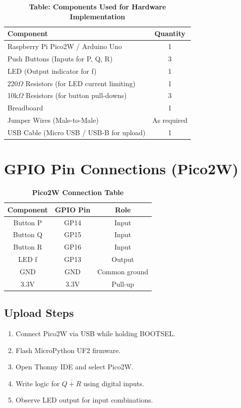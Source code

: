 \documentclass[twocolumn]{article}
\begin{document}
\begin{table}[h]
\centering
\renewcommand{\arraystretch}{1.2}
\begin{tabular}{|>{\raggedright}p{5cm}|c|}
\hline
\textbf{Component} & \textbf{Quantity} \\
\hline
Raspberry Pi Pico2W / Arduino Uno & 1 \\
Push Buttons (Inputs for P, Q, R) & 3 \\
LED (Output indicator for f) & 1 \\
220$\Omega$ Resistors (for LED current limiting) & 1 \\
10k$\Omega$ Resistors (for button pull-downs) & 3 \\
Breadboard & 1 \\
Jumper Wires (Male-to-Male) & As required \\
USB Cable (Micro USB / USB-B for upload) & 1 \\
\hline
\end{tabular}
\caption*{\textbf{Table: Components Used for Hardware Implementation}}
\end{table}

\vspace{7em}
\section*{GPIO Pin Connections (Pico2W)}

\begin{table}[h]
\centering
\renewcommand{\arraystretch}{1.2}
\begin{tabular}{|c|c|c|}
\hline
Component & GPIO Pin & Role \\
\hline
Button P & GP14 & Input \\
Button Q & GP15 & Input \\
Button R & GP16 & Input \\
LED f    & GP13 & Output \\
GND      & GND  & Common ground \\
3.3V     & 3.3V & Pull-up \\
\hline
\end{tabular}
\caption*{\textbf{Pico2W Connection Table}}
\end{table}

\subsection*{Upload Steps}
\begin{enumerate}
    \item Connect Pico2W via USB while holding BOOTSEL.
    \item Flash MicroPython UF2 firmware.
    \item Open Thonny IDE and select Pico2W.
    \item Write logic for $\overline{Q + R}$ using digital inputs.
    \item Observe LED output for input combinations.
\end{enumerate}
\end{document}
